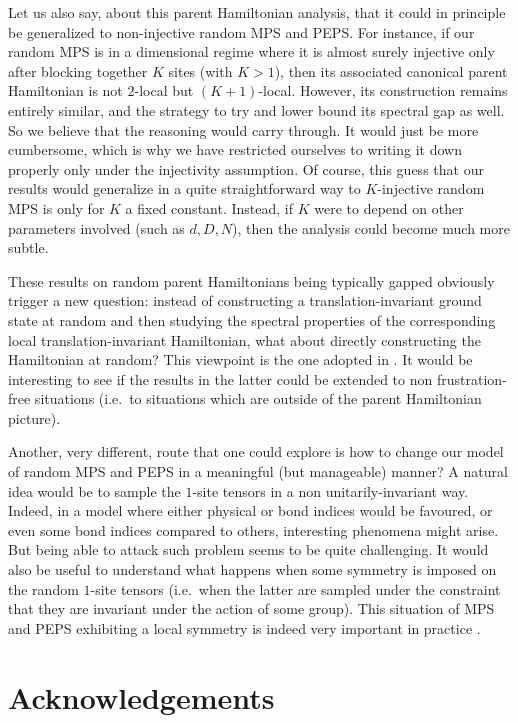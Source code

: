 \documentclass{amsart}
\begin{document}
Let us also say, about this parent Hamiltonian analysis, that it could in principle be generalized to non-injective random MPS and PEPS. For instance, if our random MPS is in a dimensional regime where it is almost surely injective only after blocking together $K$ sites (with $K>1$), then its associated canonical parent Hamiltonian is not $2$-local but $(K+1)$-local. However, its construction remains entirely similar, and the strategy to try and lower bound its spectral gap as well. So we believe that the reasoning would carry through. It would just be more cumbersome, which is why we have restricted ourselves to writing it down properly only under the injectivity assumption. Of course, this guess that our results would generalize in a quite straightforward way to $K$-injective random MPS is only for $K$ a fixed constant. Instead, if $K$ were to depend on other parameters involved (such as $d,D,N$), then the analysis could become much more subtle.

These results on random parent Hamiltonians being typically gapped obviously trigger a new question: instead of constructing a translation-invariant ground state at random and then studying the spectral properties of the corresponding local translation-invariant Hamiltonian, what about directly constructing the Hamiltonian at random? This viewpoint is the one adopted in \cite{Lem}. It would be interesting to see if the results in the latter could be extended to non frustration-free situations (i.e.~to situations which are outside of the parent Hamiltonian picture).

Another, very different, route that one could explore is how to change our model of random MPS and PEPS in a meaningful (but manageable) manner? A natural idea would be to sample the $1$-site tensors in a non unitarily-invariant way. Indeed, in a model where either physical or bond indices would be favoured, or even some bond indices compared to others, interesting phenomena might arise. But being able to attack such problem seems to be quite challenging.
It would also be useful to understand what happens when some symmetry is imposed on the random $1$-site tensors (i.e.~when the latter are sampled under the constraint that they are invariant under the action of some group). This situation of MPS and PEPS exhibiting a local symmetry is indeed very important in practice \cite{Cirac20}.

\section*{Acknowledgements}
\end{document}
